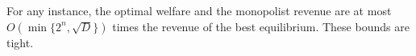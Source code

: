 
%

\begin{theorem}	
	For any instance, the optimal welfare and the monopolist revenue are at most
	$O(\min \{2^n,\sqrt{D}\})$ times the revenue of the best equilibrium. These bounds are tight.
	

	
\end{theorem}

